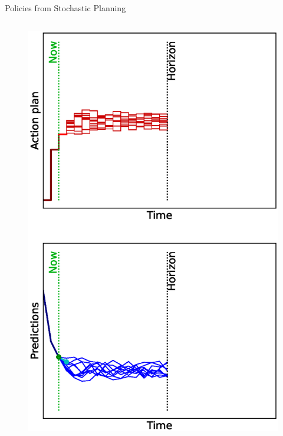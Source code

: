 \documentclass[lecture]{beamer}
\begin{document}
\begin{frame}{\normalsize Policies from Stochastic Planning}
\begin{columns}
\begin{overlayarea}{\textwidth}{0.9\textheight}
\begin{figure}
{          \includegraphics[width=\FS\textwidth,clip]{Codes/MPC/MPCMCWRONG2.eps}
        }%
        {%
}
\end{figure}
\end{overlayarea}
\end{columns}
\end{frame}
\end{document}
